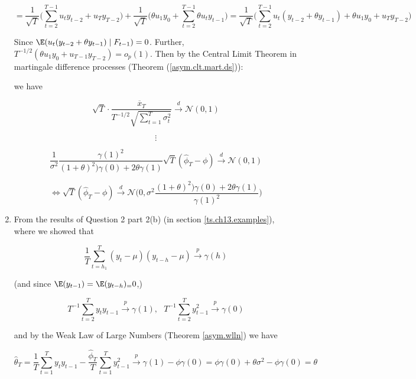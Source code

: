\begin{enumerate}[(1)]
\[
= \frac{1}{\sqrt{T}} \bigg(\sum_{t=2}^{T-1} u_t y_{t-2} + u_T y_{T-2}\bigg)  + \frac{1}{\sqrt{T}} \bigg( \theta u_1 y_0 + \sum_{t=2}^{T-1}  \theta  u_{t} y_{t-1} \bigg)  = \frac{1}{\sqrt{T}} \bigg( \sum_{t=2}^{T-1} u_t(y_{t-2} + \theta y_{t-1}) + \theta u_1 y_0 + u_T y_{T-2} \bigg)
\] 

Since \(\E( u_t(y_{t-2} + \theta y_{t-1}) \mid F_{t-1} ) = 0\). Further, \(T^{-1/2} (\theta u_1 y_0 + u_{T-1}y_{T-2}) = o_p(1)\). Then by the Central Limit Theorem in martingale difference processes (Theorem (\ref{asym.clt.mart.ds})):

\noindent{}

we have

\[
\sqrt{T} \cdot \frac{\overline{x}_T }{ T^{-1/2}\sqrt{ \sum_{t=1}^T \sigma_t^2}} \xrightarrow{d} \mathcal{N}(0, 1)
\]

\[
\vdots
\]

\[
\frac{1}{ \sigma^2} \frac{\gamma(1)^2}{(1+\theta)^2) \gamma(0) + 2 \theta \gamma(1)} \sqrt{T}(\hat{\phi}_T - \phi) \xrightarrow{d} \mathcal{N} (0, 1)
\]

\[
\iff \sqrt{T}(\hat{\phi}_T - \phi) \xrightarrow{d} \mathcal{N} \bigg( 0, \sigma^2 \frac{(1+\theta)^2) \gamma(0) + 2 \theta \gamma(1)}{\gamma(1)^2} \bigg)
\]


\item From the results of Question 2 part 2(b) (in section \ref{ts.ch13.examples}), where we showed that 

\[
\frac{1}{T}\sum_{t=h_1}^T (y_t - \mu)(y_{t-h} - \mu) \xrightarrow{p} \gamma(h)
\]

(and since \(\E(y_{t-1}) = \E(y_{t-h} )_= 0\),)

\[
T^{-1}\sum_{t=2}^T y_{t}y_{t-1} \xrightarrow{p} \gamma(1), \ \ \ T^{-1}\sum_{t=2}^T y_{t-1}^2\xrightarrow{p} \gamma(0)
\]


and by the Weak Law of Large Numbers (Theorem \ref{asym.wlln}) we have

\[
\hat{\theta}_T = \frac{1}{T} \sum_{t=1}^T y_ty_{t-1} - \frac{\hat{\phi}_T}{T} \sum_{t=1}^T y_{t-1}^2 \xrightarrow{p} \gamma(1) - \phi \gamma(0) = \phi \gamma(0) + \theta \sigma^2 - \phi \gamma(0) =  \theta
\]

\end{enumerate}

